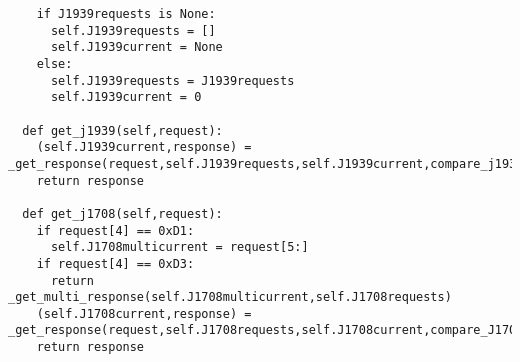\begin{verbatim}
    if J1939requests is None:
      self.J1939requests = []
      self.J1939current = None
    else:
      self.J1939requests = J1939requests
      self.J1939current = 0
  
  def get_j1939(self,request):
    (self.J1939current,response) = _get_response(request,self.J1939requests,self.J1939current,compare_j1939_msg)
    return response

  def get_j1708(self,request):
    if request[4] == 0xD1:
      self.J1708multicurrent = request[5:]
    if request[4] == 0xD3:
      return _get_multi_response(self.J1708multicurrent,self.J1708requests)
    (self.J1708current,response) = _get_response(request,self.J1708requests,self.J1708current,compare_J1708_msg)
    return response
      

\end{verbatim}
%

